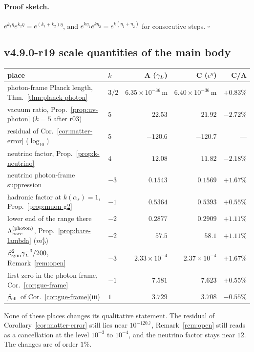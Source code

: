 \paragraph{Proof sketch.}
\(e^{k_1\eta}e^{k_2\eta}=e^{(k_1+k_2)\eta}\), and \(e^{k\eta_1}e^{k\eta_2}=e^{k(\eta_1+\eta_2)}\) for consecutive steps.  \(\square\)

\subsection*{v4.9.0-r19 scale quantities of the main body}
\label{subsec:v490-r19-scale}

\begin{center}
\small
\begin{tabular}{@{}>{\raggedright\arraybackslash}p{}>{\raggedright\arraybackslash}p{}rrr@{}}
\toprule
place & \(k\) & A (\(\gamma_L\)) & C (\(e^\eta\)) & C/A\\
\midrule
photon-frame Planck length, Thm.~\ref{thm:planck-photon} & \(3/2\) & \(6.35\times10^{-36}\,\mathrm m\) & \(6.40\times10^{-36}\,\mathrm m\) & \(+0.83\%\)\\
vacuum ratio, Prop.~\ref{prop:uv-photon} (\(k=5\) after r03) & \(5\) & \(22.53\) & \(21.92\) & \(-2.72\%\)\\
residual of Cor.~\ref{cor:matter-error} (\(\log_{10}\)) & \(5\) & \(-120.6\) & \(-120.7\) & ---\\
neutrino factor, Prop.~\ref{prop:k-neutrino} & \(4\) & \(12.08\) & \(11.82\) & \(-2.18\%\)\\
neutrino photon-frame suppression & \(-3\) & \(0.1543\) & \(0.1569\) & \(+1.67\%\)\\
hadronic factor at \(k(\alpha_s)=1\), Prop.~\ref{prop:muon-g2} & \(-1\) & \(0.5364\) & \(0.5393\) & \(+0.55\%\)\\
lower end of the range there & \(-2\) & \(0.2877\) & \(0.2909\) & \(+1.11\%\)\\
\(\Lambda_{\rm bare}^{(\mathrm{photon})}\), Prop.~\ref{prop:bare-lambda} (\(m_P^4\)) & \(-2\) & \(57.5\) & \(58.1\) & \(+1.11\%\)\\
\(\beta_{\mathrm{sym}}^2\gamma_L^{-3}/200\), Remark~\ref{rem:open} & \(-3\) & \(2.33\times10^{-4}\) & \(2.37\times10^{-4}\) & \(+1.67\%\)\\
first zero in the photon frame, Cor.~\ref{cor:gue-frame} & \(-1\) & \(7.581\) & \(7.623\) & \(+0.55\%\)\\
\(\beta_{\rm eff}\) of Cor.~\ref{cor:gue-frame}(iii) & \(1\) & \(3.729\) & \(3.708\) & \(-0.55\%\)\\
\bottomrule
\end{tabular}
\end{center}
None of these places changes its qualitative statement.  The residual of Corollary~\ref{cor:matter-error} still lies near
\(10^{-120.7}\), Remark~\ref{rem:open} still reads as a cancellation at the level \(10^{-3}\) to \(10^{-4}\), and the neutrino factor
stays near \(12\).  The changes are of order \(1\%\).

